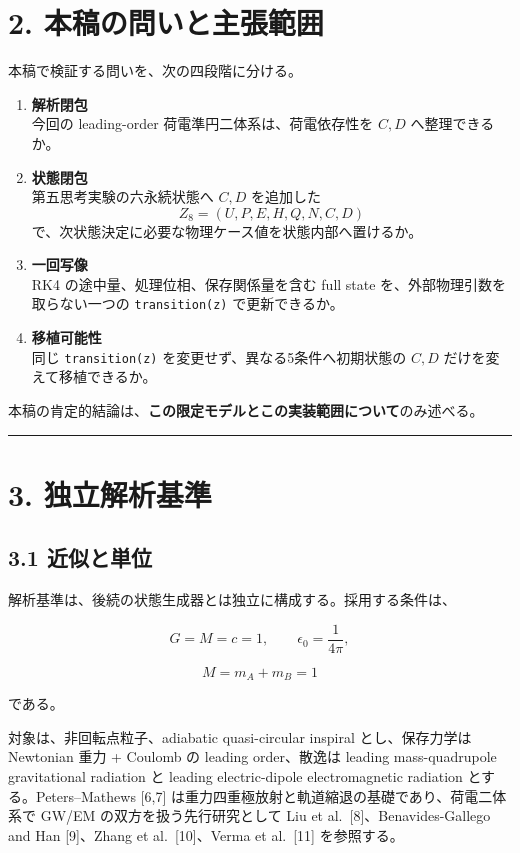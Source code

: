 \documentclass[
  a4paper,
]{ltjsarticle}
\begin{document}
\section{2.
本稿の問いと主張範囲}\label{ux672cux7a3fux306eux554fux3044ux3068ux4e3bux5f35ux7bc4ux56f2}

本稿で検証する問いを、次の四段階に分ける。

\begin{enumerate}
\def\labelenumi{\arabic{enumi}.}
\item
  \textbf{解析閉包}\\
  今回の leading-order 荷電準円二体系は、荷電依存性を \(C,D\)
  へ整理できるか。
\item
  \textbf{状態閉包}\\
  第五思考実験の六永続状態へ \(C,D\) を追加した \[
  Z_8=(U,P,E,H,Q,N,C,D)
  \] で、次状態決定に必要な物理ケース値を状態内部へ置けるか。
\item
  \textbf{一回写像}\\
  RK4 の途中量、処理位相、保存関係量を含む full state
  を、外部物理引数を取らない一つの \texttt{transition(z)}
  で更新できるか。
\item
  \textbf{移植可能性}\\
  同じ \texttt{transition(z)} を変更せず、異なる5条件へ初期状態の
  \(C,D\) だけを変えて移植できるか。
\end{enumerate}

本稿の肯定的結論は、\textbf{この限定モデルとこの実装範囲について}のみ述べる。

\begin{center}\rule{0.5\linewidth}{0.5pt}\end{center}

\section{3. 独立解析基準}\label{ux72ecux7acbux89e3ux6790ux57faux6e96}

\subsection{3.1 近似と単位}\label{ux8fd1ux4f3cux3068ux5358ux4f4d}

解析基準は、後続の状態生成器とは独立に構成する。採用する条件は、

\[
G=M=c=1,
\qquad
\epsilon_0=\frac{1}{4\pi},
\]

\[
M=m_A+m_B=1
\]

である。

対象は、非回転点粒子、adiabatic quasi-circular inspiral とし、保存力学は
Newtonian 重力 + Coulomb の leading order、散逸は leading
mass-quadrupole gravitational radiation と leading electric-dipole
electromagnetic radiation とする。Peters--Mathews {[}6,7{]}
は重力四重極放射と軌道縮退の基礎であり、荷電二体系で GW/EM
の双方を扱う先行研究として Liu et al.~{[}8{]}、Benavides-Gallego and Han
{[}9{]}、Zhang et al.~{[}10{]}、Verma et al.~{[}11{]} を参照する。
\end{document}
